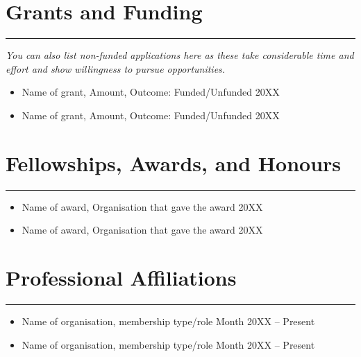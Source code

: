 \documentclass{article}
\begin{document}
\section*{Grants and Funding}
\hrule
\vspace{1em}
\textit{You can also list non-funded applications here as these take considerable time and effort and show willingness to pursue opportunities.}

\begin{itemize}[leftmargin=*]
    \item[] Name of grant, Amount, Outcome: Funded/Unfunded \hfill 20XX
    \item[] Name of grant, Amount, Outcome: Funded/Unfunded \hfill 20XX
\end{itemize}

\section*{Fellowships, Awards, and Honours}
\hrule
\vspace{1em}

\begin{itemize}[leftmargin=*]
    \item[] Name of award, Organisation that gave the award \hfill 20XX
    \item[] Name of award, Organisation that gave the award \hfill 20XX
\end{itemize}

\section*{Professional Affiliations}
\hrule
\vspace{1em}

\begin{itemize}[leftmargin=*]
    \item[] Name of organisation, membership type/role \hfill Month 20XX -- Present
    \item[] Name of organisation, membership type/role \hfill Month 20XX -- Present
\end{itemize}
\end{document}
